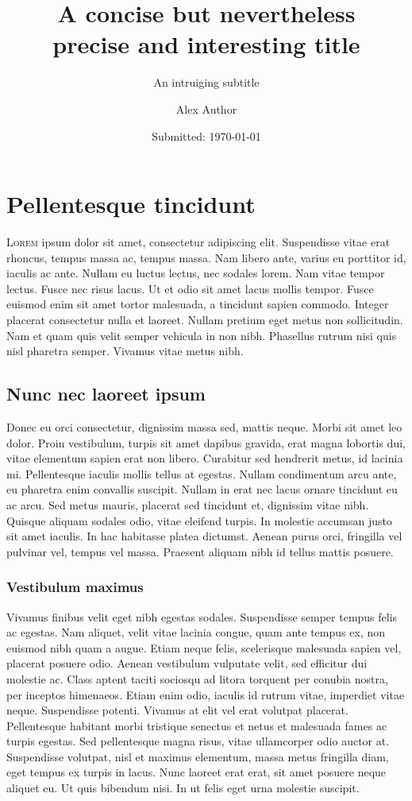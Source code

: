 \documentclass[11pt, a4paper]{memoir}
\author{Alex Author}
\title{A concise but nevertheless\\precise and interesting title}
\subtitle{An intruiging subtitle}
\date{Submitted: \today}
\begin{document}
\begingroup
  \selectfont
  \maketitle
\endgroup

\tableofcontents

\section{Pellentesque tincidunt}
\lettrine{L}{orem} ipsum dolor sit amet, consectetur adipiscing elit. Suspendisse vitae erat rhoncus, tempus massa ac, tempus massa. Nam libero ante, varius eu porttitor id, iaculis ac ante. Nullam eu luctus lectus, nec sodales lorem. Nam vitae tempor lectus. Fusce nec risus lacus. Ut et odio sit amet lacus mollis tempor. Fusce euismod enim sit amet tortor malesuada, a tincidunt sapien commodo. Integer placerat consectetur nulla et laoreet. Nullam pretium eget metus non sollicitudin. Nam et quam quis velit semper vehicula in non nibh. Phasellus rutrum nisi quis nisl pharetra semper. Vivamus vitae metus nibh.

\subsection{Nunc nec laoreet ipsum}
Donec eu orci consectetur, dignissim massa sed, mattis neque. Morbi sit amet leo dolor. Proin vestibulum, turpis sit amet dapibus gravida, erat magna lobortis dui, vitae elementum sapien erat non libero. Curabitur sed hendrerit metus, id lacinia mi. Pellentesque iaculis mollis tellus at egestas. Nullam condimentum arcu ante, eu pharetra enim convallis suscipit. Nullam in erat nec lacus ornare tincidunt eu ac arcu. Sed metus mauris, placerat sed tincidunt et, dignissim vitae nibh. Quisque aliquam sodales odio, vitae eleifend turpis. In molestie accumsan justo sit amet iaculis. In hac habitasse platea dictumst. Aenean purus orci, fringilla vel pulvinar vel, tempus vel massa. Praesent aliquam nibh id tellus mattis posuere.

\subsubsection{Vestibulum maximus}
Vivamus finibus velit eget nibh egestas sodales. Suspendisse semper tempus felis ac egestas. Nam aliquet, velit vitae lacinia congue, quam ante tempus ex, non euismod nibh quam a augue. Etiam neque felis, scelerisque malesuada sapien vel, placerat posuere odio. Aenean vestibulum vulputate velit, sed efficitur dui molestie ac. Class aptent taciti sociosqu ad litora torquent per conubia nostra, per inceptos himenaeos. Etiam enim odio, iaculis id rutrum vitae, imperdiet vitae neque. Suspendisse potenti. Vivamus at elit vel erat volutpat placerat. Pellentesque habitant morbi tristique senectus et netus et malesuada fames ac turpis egestas. Sed pellentesque magna risus, vitae ullamcorper odio auctor at. Suspendisse volutpat, nisl et maximus elementum, massa metus fringilla diam, eget tempus ex turpis in lacus. Nunc laoreet erat erat, sit amet posuere neque aliquet eu. Ut quis bibendum nisi. In ut felis eget urna molestie suscipit.
\end{document}
